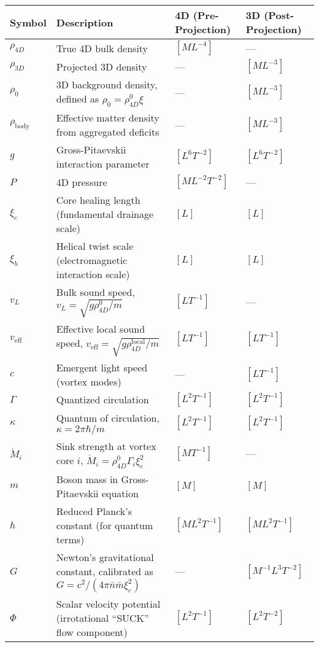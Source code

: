 \begin{table}[H]
\centering
\begin{tabularx}{\textwidth}{|l|Y|l|l|}
\hline
Symbol & Description & 4D (Pre-Projection) & 3D (Post-Projection) \\
\hline
$\rho_{4D}$ & True 4D bulk density & $[M L^{-4}]$ & --- \\
\hline
$\rho_{3D}$ & Projected 3D density & --- & $[M L^{-3}]$ \\
\hline
$\rho_0$ & 3D background density, defined as $\rho_0 = \rho_{4D}^0 \xi$ & --- & $[M L^{-3}]$ \\
\hline
$\rho_{\text{body}}$ & Effective matter density from aggregated deficits & --- & $[M L^{-3}]$ \\
\hline
$g$ & Gross-Pitaevskii interaction parameter & $[L^6 T^{-2}]$ & $[L^6 T^{-2}]$ \\
\hline
$P$ & 4D pressure & $[M L^{-2} T^{-2}]$ & --- \\
\hline
$\xi_c$ & Core healing length (fundamental drainage scale) & $[L]$ & $[L]$ \\
\hline
$\xi_h$ & Helical twist scale (electromagnetic interaction scale) & $[L]$ & $[L]$ \\
\hline
$v_L$ & Bulk sound speed, $v_L = \sqrt{g \rho_{4D}^0 / m}$ & $[L T^{-1}]$ & --- \\
\hline
$v_{\text{eff}}$ & Effective local sound speed, $v_{\text{eff}} = \sqrt{g \rho_{4D}^{\text{local}} / m}$ & $[L T^{-1}]$ & $[L T^{-1}]$ \\
\hline
$c$ & Emergent light speed (vortex modes) & --- & $[L T^{-1}]$ \\
\hline
$\Gamma$ & Quantized circulation & $[L^2 T^{-1}]$ & $[L^2 T^{-1}]$ \\
\hline
$\kappa$ & Quantum of circulation, $\kappa = 2 \pi \hbar / m$ & $[L^2 T^{-1}]$ & $[L^2 T^{-1}]$ \\
\hline
$\dot{M}_i$ & Sink strength at vortex core $i$, $\dot{M}_i = \rho_{4D}^0 \Gamma_i \xi_c^2$ & $[M T^{-1}]$ & --- \\
\hline
$m$ & Boson mass in Gross-Pitaevskii equation & $[M]$ & $[M]$ \\
\hline
$\hbar$ & Reduced Planck's constant (for quantum terms) & $[M L^2 T^{-1}]$ & $[M L^2 T^{-1}]$ \\
\hline
$G$ & Newton's gravitational constant, calibrated as $G = c^2 / (4\pi \bar{n} \bar{m} \xi_c^2)$ & --- & $[M^{-1} L^3 T^{-2}]$ \\
\hline
$\Phi$ & Scalar velocity potential (irrotational ``SUCK'' flow component) & $[L^2 T^{-1}]$ & $[L^2 T^{-2}]$ \\

\end{tabularx}
\end{table}
